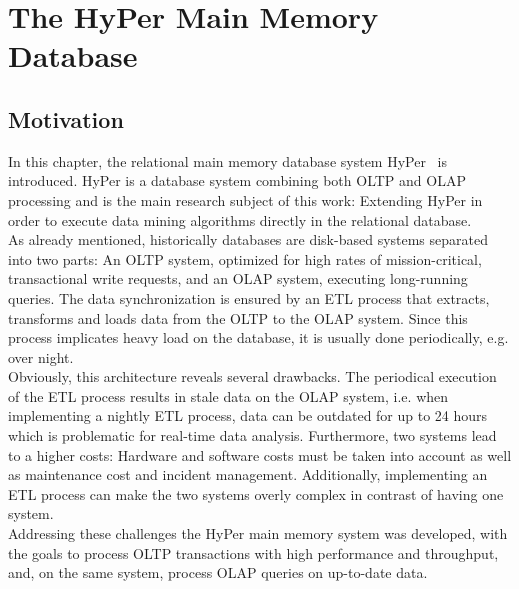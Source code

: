 \chapter{The HyPer Main Memory Database}\label{chapter:hyper}
\section{Motivation}
In this chapter, the relational main memory database system HyPer~\parencite{5767867} is introduced. HyPer is a database system combining both OLTP and OLAP processing and is the main research subject of this work: Extending HyPer in order to execute data mining algorithms directly in the relational database.
\\
As already mentioned, historically databases are disk-based systems separated into two parts: An OLTP system, optimized for high rates of mission-critical, transactional write requests, and an OLAP system, executing long-running queries. The data synchronization is ensured by an ETL process that extracts, transforms and loads data from the OLTP to the OLAP system. Since this process implicates heavy load on the database, it is usually done periodically, e.g. over night. 
\\
Obviously, this architecture reveals several drawbacks. The periodical execution of the ETL process results in stale data on the OLAP system, i.e. when implementing a nightly ETL process, data can be outdated for up to 24 hours which is problematic for real-time data analysis. Furthermore, two systems lead to a higher costs: Hardware and software costs must be taken into account as well as maintenance cost and incident management. Additionally, implementing an ETL process can make the two systems overly complex in contrast of having one system.
\\
Addressing these challenges the HyPer main memory system was developed, with the goals to process OLTP transactions with high performance and throughput, and, on the same system, process OLAP queries on up-to-date data. 

